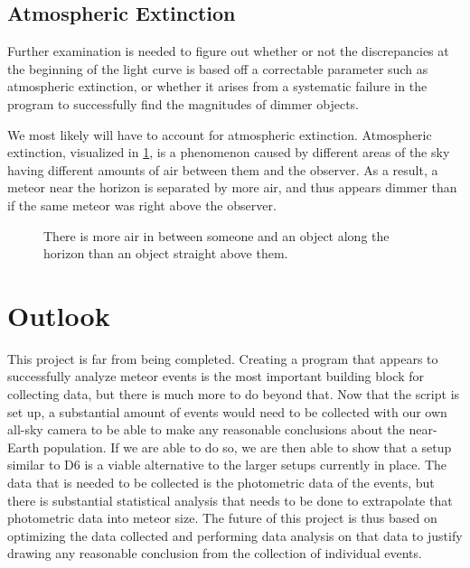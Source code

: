 \subsection{Atmospheric Extinction}
Further examination is needed to figure out whether or not the discrepancies at the beginning of the light curve is based off a correctable parameter such as atmospheric extinction, or whether it arises from a systematic failure in the program to successfully find the magnitudes of dimmer objects.

We most likely will have to account for atmospheric extinction. Atmospheric extinction, visualized in \ref{fig:extinction}, is a phenomenon caused by different areas of the sky having different amounts of air between them and the observer. As a result, a meteor near the horizon is separated by more air, and thus appears dimmer than if the same meteor was right above the observer. 
\begin{figure}[ht!]
	\centering
	\caption{There is more air in between someone and an object along the horizon than an object straight above them.}
	\label{fig:extinction}
\end{figure}


\section{Outlook}
This project is far from being completed. Creating a program that appears to successfully analyze meteor events is the most important building block for collecting data, but there is much more to do beyond that. Now that the script is set up, a substantial amount of events would need to be collected with our own all-sky camera to be able to make any reasonable conclusions about the near-Earth population. If we are able to do so, we are then able to show that a setup similar to D6 is a viable alternative to the larger setups currently in place.  The data that is needed to be collected is the photometric data of the events, but there is substantial statistical analysis that needs to be done to extrapolate that photometric data into meteor size. The future of this project is thus based on optimizing the data collected and performing data analysis on that data to justify drawing any reasonable conclusion from the collection of individual events.
